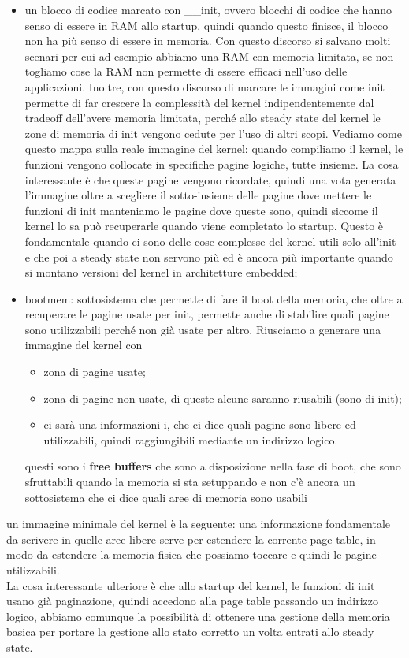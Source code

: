 \documentclass[12pt, oneside]{extbook}
\begin{document}
\begin{itemize}
\item un blocco di codice marcato con \_\_init, ovvero blocchi di codice che hanno senso di essere in RAM allo startup, quindi quando questo finisce, il blocco non ha più senso di essere in memoria. Con questo discorso si salvano molti scenari per cui ad esempio abbiamo una RAM con memoria limitata, se non togliamo cose la RAM non permette di essere efficaci nell'uso delle applicazioni. Inoltre, con questo discorso di marcare le immagini come init permette di far crescere la complessità del kernel indipendentemente dal tradeoff dell'avere memoria limitata, perché allo steady state del kernel le zone di memoria di init vengono cedute per l'uso di altri scopi. Vediamo come questo mappa sulla reale immagine del kernel: quando compiliamo il kernel, le funzioni vengono collocate in specifiche pagine logiche, tutte insieme. La cosa interessante è che queste pagine vengono ricordate, quindi una vota generata l'immagine oltre a scegliere il sotto-insieme delle pagine dove mettere le funzioni di init manteniamo le pagine dove queste sono, quindi siccome il kernel lo sa può recuperarle quando viene completato lo startup. Questo è fondamentale quando ci sono delle cose complesse del kernel utili solo all'init e che poi a steady state non servono più ed è ancora più importante quando si montano versioni del kernel in architetture embedded;
\item bootmem: sottosistema che permette di fare il boot della memoria, che oltre a recuperare le pagine usate per init, permette anche di stabilire quali pagine sono utilizzabili perché non già usate per altro. Riusciamo a generare una immagine del kernel con
\begin{itemize}
\item zona di pagine usate;
\item zona di pagine non usate, di queste alcune saranno riusabili (sono di init);
\item ci sarà una informazioni i, che ci dice quali pagine sono libere ed utilizzabili, quindi raggiungibili mediante un indirizzo logico.
\end{itemize}
questi sono i \textbf{free buffers} che sono a disposizione nella fase di boot, che sono sfruttabili quando la memoria si sta setuppando e non c'è ancora un sottosistema che ci dice quali aree di memoria sono usabili
\end{itemize}
un immagine minimale del kernel è la seguente:
una informazione fondamentale da scrivere in quelle aree libere serve per estendere la corrente page table, in modo da estendere la memoria fisica che possiamo toccare e quindi le pagine utilizzabili.\\ La cosa interessante ulteriore è che allo startup del kernel, le funzioni di init usano già paginazione, quindi accedono alla page table passando un indirizzo logico, abbiamo comunque la possibilità di ottenere una gestione della memoria basica per portare la gestione allo stato corretto un volta entrati allo steady state.
\end{document}
